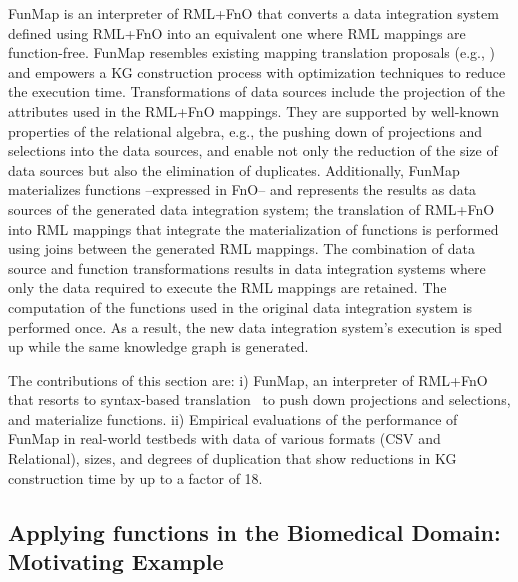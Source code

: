 FunMap is an interpreter of RML+FnO that converts a data integration system defined using RML+FnO into an equivalent one where RML mappings are function-free. FunMap resembles existing mapping translation proposals (e.g., \citep{AliW19,corcho2019towards,junior2016funul}) and empowers a KG construction process with optimization techniques to reduce the execution time. Transformations of data sources include the projection of the attributes used in the RML+FnO mappings. They are supported by well-known properties of the relational algebra, e.g., the pushing down of projections and selections into the data sources, and enable not only the reduction of the size of data sources but also the elimination of duplicates. Additionally, FunMap materializes functions --expressed in FnO-- and represents the results as data sources of the generated data integration system; the translation of RML+FnO into RML mappings that integrate the materialization of functions is performed using joins between the generated RML mappings. The combination of data source and function transformations results in data integration systems where only the data required to execute the RML mappings are retained. The computation of the functions used in the original data integration system is performed once. As a result, the new data integration system's execution is sped up while the same knowledge graph is generated. 

The contributions of this section are: i) FunMap, an interpreter of RML+FnO that resorts to syntax-based translation~\citep{aho1986compilers} to push down projections and selections, and materialize functions. ii) Empirical evaluations of the performance of FunMap in real-world testbeds with data of various formats (CSV and Relational), sizes, and degrees of duplication that show reductions in KG construction time by up to a factor of 18.

\subsection{Applying functions in the Biomedical Domain: Motivating Example}

